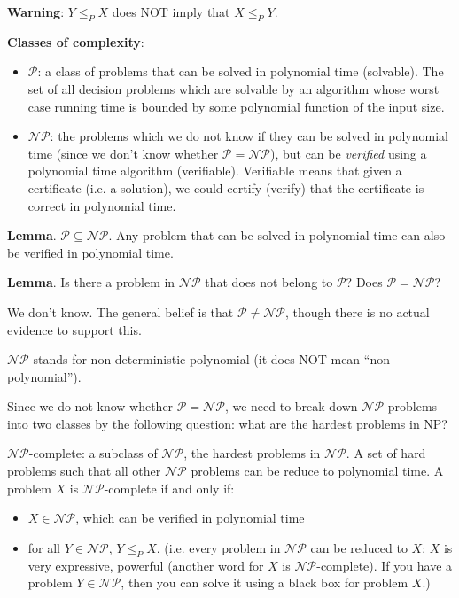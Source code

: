 \documentclass{article}
\begin{document}
\textbf{Warning}: $Y \leq_P X$ does NOT imply that $X \leq_P Y$.

\textbf{Classes of complexity}:

\begin{itemize}
    \item $\mathcal{P}$: a class of problems that can be solved in polynomial time (solvable). The set of all decision problems which are solvable by an algorithm whose worst case running time is bounded by some polynomial function of the input size.
    \item $\mathcal{NP}$: the problems which we do not know if they can be solved in polynomial time (since we don't know whether $\mathcal{P} = \mathcal{NP}$), but can be \textit{verified} using a polynomial time algorithm (verifiable). Verifiable means that given a certificate (i.e. a solution), we could certify (verify) that the certificate is correct in polynomial time.
\end{itemize}

\textbf{Lemma}. $\mathcal{P} \subseteq \mathcal{NP}$. Any problem that can be solved in polynomial time can also be verified in polynomial time.

\textbf{Lemma}. Is there a problem in $\mathcal{NP}$ that does not belong to $\mathcal{P}$? Does $\mathcal{P} = \mathcal{NP}$?

We don't know. The general belief is that $\mathcal{P} \neq \mathcal{NP}$, though there is no actual evidence to support this.

$\mathcal{NP}$ stands for non-deterministic polynomial (it does NOT mean ``non-polynomial'').

Since we do not know whether $\mathcal{P} = \mathcal{NP}$, we need to break down $\mathcal{NP}$ problems into two classes by the following question: what are the hardest problems in NP?

$\mathcal{NP}$-complete: a subclass of $\mathcal{NP}$, the hardest problems in $\mathcal{NP}$. A set of hard problems such that all other $\mathcal{NP}$ problems can be reduce to polynomial time. A problem $X$ is $\mathcal{NP}$-complete if and only if:
\begin{itemize}
    \item $X \in \mathcal{NP}$, which can be verified in polynomial time
    \item for all $Y \in \mathcal{NP}$, $Y \leq_P X$. (i.e. every problem in $\mathcal{NP}$ can be reduced to $X$; $X$ is very expressive, powerful (another word for $X$ is $\mathcal{NP}$-complete). If you have a problem $Y \in \mathcal{NP}$, then you can solve it using a black box for problem $X$.)
\end{itemize}
\end{document}
